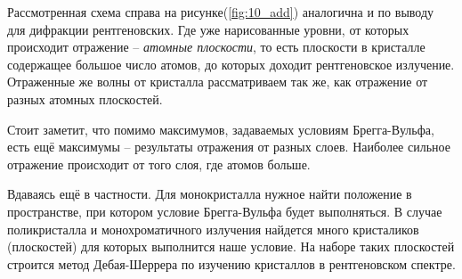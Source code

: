 Рассмотренная схема справа на рисунке(\ref{fig:10_add}) аналогична и по выводу для дифракции рентгеновских. Где уже нарисованные уровни, от которых происходит отражение -- \textit{атомные плоскости}, то есть плоскости в кристалле содержащее большое число атомов, до которых доходит рентгеновское излучение.
Отраженные же волны от кристалла рассматриваем так же, как отражение от разных атомных плоскостей.

Стоит заметит, что помимо максимумов, задаваемых условиям Брегга-Вульфа, есть ещё максимумы -- результаты отражения от разных слоев. Наиболее сильное отражение происходит от того слоя, где атомов больше.

Вдаваясь ещё в частности. Для монокристалла нужное найти положение в пространстве, при котором условие Брегга-Вульфа будет выполняться. В случае поликристалла и монохроматичного излучения найдется много кристаликов (плоскостей) для которых выполнится наше условие. На наборе таких плоскостей строится метод Дебая-Шеррера по изучению кристаллов в рентгеновском спектре.